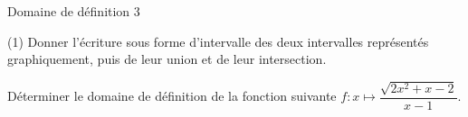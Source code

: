 \documentclass{beamer}
\begin{document}
\begin{frame}{Domaine de définition 3}

	\begin{tasks}(1)
		\task Donner l'écriture sous forme d'intervalle des deux intervalles représentés graphiquement, puis de leur union et de leur intersection.
\medskip

		\task  
		Déterminer le domaine de définition de la fonction suivante $f:x\mapsto \dfrac{\sqrt{2x^2+x-2}}{x-1}$.
	\end{tasks}
\end{frame}
\end{document}
